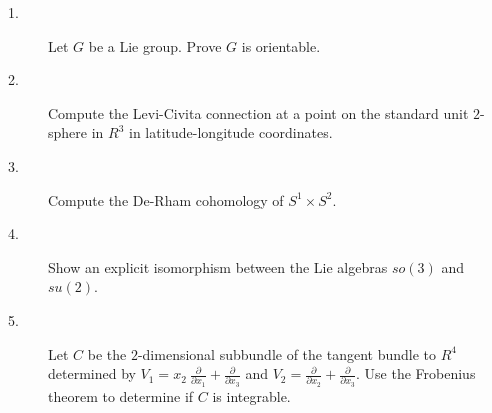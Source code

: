 \documentclass[12pt,bbb]{report}
\begin{document}
\begin{description}

\item[1.] Let  $G$  be a Lie group.  Prove  $G$  is orientable.


\item[2.] Compute the Levi-Civita connection at a point on the standard
unit  $2$-sphere in  $R^3$  in latitude-longitude coordinates.


\item[3.] Compute the De-Rham cohomology of  $S^1 \times S^2$.


\item[4.] Show an explicit isomorphism between the Lie algebras  $so(3)$
and  $su(2)$.


\item[5.] Let  $C$  be the  $2$-dimensional subbundle of the tangent
bundle to  $R^4$  determined by  $V_1 = x_2 \ \frac \partial{\partial
x_1} + \frac \partial{\partial x_3}$  and  $V_2 = \frac
\partial{\partial x_2} + \frac \partial{\partial x_3}$.  Use the
Frobenius theorem to determine if  $C$  is integrable.

\end{description}

\end{document}
